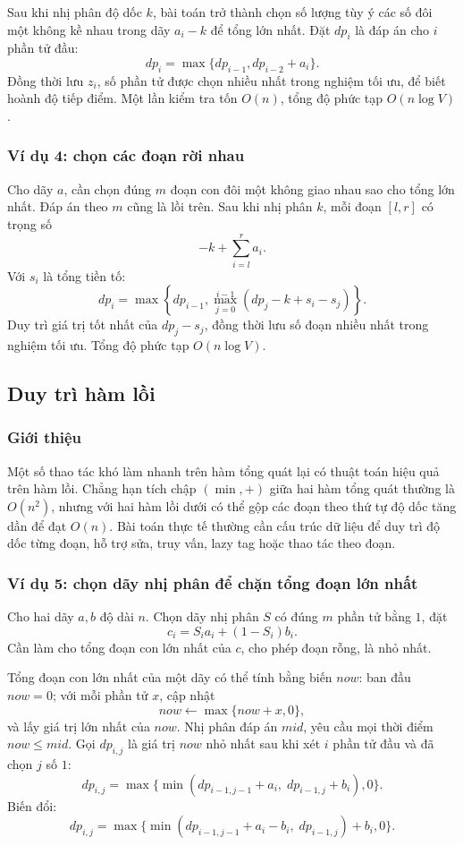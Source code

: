 \documentclass[11pt]{article}
\begin{document}
Sau khi nhị phân độ dốc \(k\), bài toán trở thành chọn số lượng tùy ý các số
đôi một không kề nhau trong dãy \(a_i-k\) để tổng lớn nhất. Đặt \(dp_i\) là
đáp án cho \(i\) phần tử đầu:
\[
  dp_i=\max\{dp_{i-1},dp_{i-2}+a_i\}.
\]
Đồng thời lưu \(z_i\), số phần tử được chọn nhiều nhất trong nghiệm tối ưu, để
biết hoành độ tiếp điểm. Một lần kiểm tra tốn \(O(n)\), tổng độ phức tạp
\(O(n\log V)\).

\subsubsection{Ví dụ 4: chọn các đoạn rời nhau}

Cho dãy \(a\), cần chọn đúng \(m\) đoạn con đôi một không giao nhau sao cho
tổng lớn nhất. Đáp án theo \(m\) cũng là lồi trên. Sau khi nhị phân \(k\), mỗi
đoạn \([l,r]\) có trọng số
\[
  -k+\sum_{i=l}^r a_i.
\]
Với \(s_i\) là tổng tiền tố:
\[
  dp_i=\max\left\{dp_{i-1},\max_{j=0}^{i-1}(dp_j-k+s_i-s_j)\right\}.
\]
Duy trì giá trị tốt nhất của \(dp_j-s_j\), đồng thời lưu số đoạn nhiều nhất
trong nghiệm tối ưu. Tổng độ phức tạp \(O(n\log V)\).

\subsection{Duy trì hàm lồi}

\subsubsection{Giới thiệu}

Một số thao tác khó làm nhanh trên hàm tổng quát lại có thuật toán hiệu quả
trên hàm lồi. Chẳng hạn tích chập \((\min,+)\) giữa hai hàm tổng quát thường
là \(O(n^2)\), nhưng với hai hàm lồi dưới có thể gộp các đoạn theo thứ tự độ
dốc tăng dần để đạt \(O(n)\). Bài toán thực tế thường cần cấu trúc dữ liệu để
duy trì độ dốc từng đoạn, hỗ trợ sửa, truy vấn, lazy tag hoặc thao tác theo
đoạn.

\subsubsection{Ví dụ 5: chọn dãy nhị phân để chặn tổng đoạn lớn nhất}

Cho hai dãy \(a,b\) độ dài \(n\). Chọn dãy nhị phân \(S\) có đúng \(m\) phần tử
bằng \(1\), đặt
\[
  c_i=S_i a_i+(1-S_i)b_i.
\]
Cần làm cho tổng đoạn con lớn nhất của \(c\), cho phép đoạn rỗng, là nhỏ nhất.

Tổng đoạn con lớn nhất của một dãy có thể tính bằng biến \(now\): ban đầu
\(now=0\); với mỗi phần tử \(x\), cập nhật
\[
  now\gets \max\{now+x,0\},
\]
và lấy giá trị lớn nhất của \(now\). Nhị phân đáp án \(mid\), yêu cầu mọi thời
điểm \(now\le mid\). Gọi \(dp_{i,j}\) là giá trị \(now\) nhỏ nhất sau khi xét
\(i\) phần tử đầu và đã chọn \(j\) số \(1\):
\[
  dp_{i,j}=\max\{\min(dp_{i-1,j-1}+a_i,\;dp_{i-1,j}+b_i),0\}.
\]
Biến đổi:
\[
  dp_{i,j}=\max\{\min(dp_{i-1,j-1}+a_i-b_i,\;dp_{i-1,j})+b_i,0\}.
\]
\end{document}
